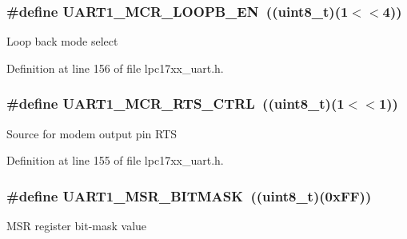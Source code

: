 \subsubsection[{\texorpdfstring{U\+A\+R\+T1\+\_\+\+M\+C\+R\+\_\+\+L\+O\+O\+P\+B\+\_\+\+EN}{UART1_MCR_LOOPB_EN}}]{\setlength{\rightskip}{0pt plus 5cm}\#define U\+A\+R\+T1\+\_\+\+M\+C\+R\+\_\+\+L\+O\+O\+P\+B\+\_\+\+EN~(({\bf uint8\+\_\+t})(1$<$$<$4))}\hypertarget{group___u_a_r_t___private___macros_ga2c22f6069fc2d3d621cd8b2e578d69a3}{}\label{group___u_a_r_t___private___macros_ga2c22f6069fc2d3d621cd8b2e578d69a3}
Loop back mode select 

Definition at line 156 of file lpc17xx\+\_\+uart.\+h.

\subsubsection[{\texorpdfstring{U\+A\+R\+T1\+\_\+\+M\+C\+R\+\_\+\+R\+T\+S\+\_\+\+C\+T\+RL}{UART1_MCR_RTS_CTRL}}]{\setlength{\rightskip}{0pt plus 5cm}\#define U\+A\+R\+T1\+\_\+\+M\+C\+R\+\_\+\+R\+T\+S\+\_\+\+C\+T\+RL~(({\bf uint8\+\_\+t})(1$<$$<$1))}\hypertarget{group___u_a_r_t___private___macros_ga2e84ce056119e87adccff0b8cec560b1}{}\label{group___u_a_r_t___private___macros_ga2e84ce056119e87adccff0b8cec560b1}
Source for modem output pin R\+TS 

Definition at line 155 of file lpc17xx\+\_\+uart.\+h.

\subsubsection[{\texorpdfstring{U\+A\+R\+T1\+\_\+\+M\+S\+R\+\_\+\+B\+I\+T\+M\+A\+SK}{UART1_MSR_BITMASK}}]{\setlength{\rightskip}{0pt plus 5cm}\#define U\+A\+R\+T1\+\_\+\+M\+S\+R\+\_\+\+B\+I\+T\+M\+A\+SK~(({\bf uint8\+\_\+t})(0x\+F\+F))}\hypertarget{group___u_a_r_t___private___macros_gaa25ca1b2a81d8ee9d9aad9cafdd04668}{}\label{group___u_a_r_t___private___macros_gaa25ca1b2a81d8ee9d9aad9cafdd04668}
M\+SR register bit-\/mask value 

